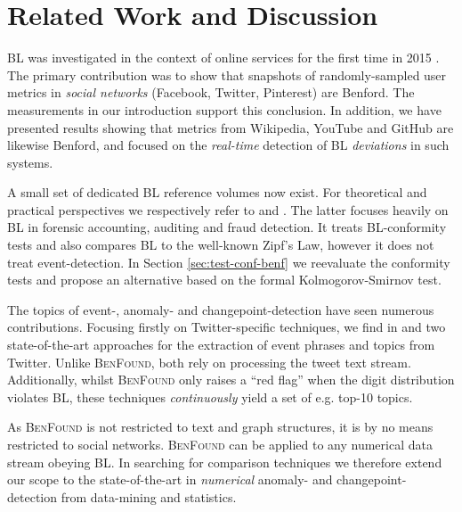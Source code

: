 \documentclass[twoside,leqno,twocolumn]{article}\usepackage[]{graphicx}\usepackage[]{color}
\newcommand{\algoname}{\textsc{BenFound}}
\begin{document}

\section{Related Work and Discussion}
\label{sec:related-work}

BL was investigated in the context of online services for the first time in 2015 \cite{golbeck2015}. The primary contribution was to show that snapshots of randomly-sampled user metrics in \textit{social networks} (Facebook, Twitter, Pinterest) are Benford. The measurements in our introduction support this conclusion. In addition, we have presented results showing that metrics from Wikipedia, YouTube and GitHub are likewise Benford, and focused on the \textit{real-time} detection of BL \textit{deviations} in such systems.

A small set of dedicated BL reference volumes now exist. For theoretical and practical perspectives we respectively refer to \cite{berger2015Intro} and \cite{nigrini2012}. The latter focuses heavily on BL in forensic accounting, auditing and fraud detection. It treats BL-conformity tests and also compares BL to the well-known Zipf's Law, however it does not treat event-detection. In Section \ref{sec:test-conf-benf} we reevaluate the conformity tests and propose an alternative based on the formal Kolmogorov-Smirnov test.

The topics of event-, anomaly- and changepoint-detection have seen numerous contributions. Focusing firstly on Twitter-specific techniques, we find in \cite{ritter2012open} and \cite{hayashi2015real} two state-of-the-art approaches for the extraction of event phrases and topics from Twitter. Unlike \algoname{}, both rely on processing the tweet text stream. Additionally, whilst \algoname{} only raises a ``red flag'' when the digit distribution violates BL, these techniques \textit{continuously} yield a set of e.g. top-10 topics.

As \algoname{} is not restricted to text and graph structures, it is by no means restricted to social networks. \algoname{} can be applied to any numerical data stream obeying BL. In searching for comparison techniques we therefore extend our scope to the state-of-the-art in \textit{numerical} anomaly- and changepoint-detection from data-mining and statistics.
\end{document}
